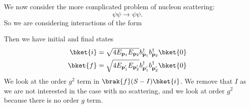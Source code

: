 \documentclass[a4paper]{article}
\begin{document}
\begin{eg}
  We now consider the more complicated problem of nucleon scattering:
  \[
    \psi \psi \to \psi \psi.
  \]
  So we are considering interactions of the form
  \begin{center}
  \end{center}
  Then we have initial and final states
  \begin{align*}
    \bket{i} &= \sqrt{4 E_{\mathbf{p}_1} E_{\mathbf{p}_2}} b_{\mathbf{p}_1}^\dagger b_{\mathbf{p}_2}^\dagger\bket{0}\\
    \bket{f} &= \sqrt{4 E_{\mathbf{p}_1'} E_{\mathbf{p}_2'}} b_{\mathbf{p}_1'}^\dagger b_{\mathbf{p}_2'}^\dagger\bket{0}
  \end{align*}
  We look at the order $g^2$ term in $\brak{f}(S - I)\bket{i}$. We remove that $I$ as we are not interested in the case with no scattering, and we look at order $g^2$ because there is no order $g$ term.


\end{eg}
\end{document}
